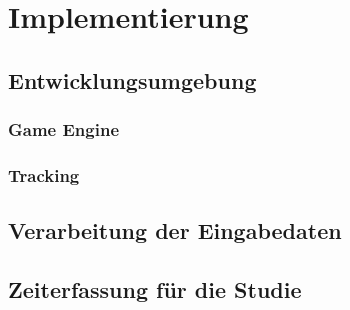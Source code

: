 \chapter{Implementierung}

\section{Entwicklungsumgebung}

\subsection{Game Engine}

\subsection{Tracking}

\section{Verarbeitung der Eingabedaten}

\section{Zeiterfassung für die Studie}